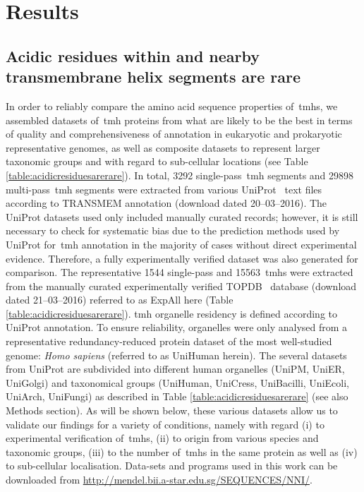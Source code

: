 \section{Results}

\subsection{Acidic residues within and nearby transmembrane helix segments are rare}

In order to reliably compare the amino acid sequence properties of~\gls{tmh}s, we assembled datasets of~\gls{tmh} proteins from what are likely to be the best in terms of quality and comprehensiveness of annotation in eukaryotic and prokaryotic representative genomes, as well as composite datasets to represent larger taxonomic groups and with regard to sub-cellular locations (see Table \ref{table:acidicresiduesarerare}).
In total, 3292 single-pass~\gls{tmh} segments and 29898 multi-pass~\gls{tmh} segments were extracted from various UniProt~\cite{TheUniProtConsortium2014} text files according to TRANSMEM annotation (download dated 20--03--2016).
The UniProt datasets used only included manually curated records; however, it is still necessary to check for systematic bias due to the prediction methods used by UniProt for~\gls{tmh} annotation in the majority of cases without direct experimental evidence.
Therefore, a fully experimentally verified dataset was also generated for comparison.
The representative 1544 single-pass and 15563~\gls{tmh}s were extracted from the manually curated experimentally verified TOPDB~\cite{Dobson2015} database (download dated 21--03--2016) referred to as ExpAll here (Table \ref{table:acidicresiduesarerare}).
\gls{tmh} organelle residency is defined according to UniProt annotation.
To ensure reliability, organelles were only analysed from a representative redundancy-reduced protein dataset of the most well-studied genome: \textit{Homo sapiens} (referred to as UniHuman herein).
The several datasets from UniProt  are subdivided into different human organelles (UniPM, UniER, UniGolgi) and taxonomical groups (UniHuman, UniCress, UniBacilli, UniEcoli, UniArch, UniFungi) as described in Table \ref{table:acidicresiduesarerare} (see also Methods section).
As will be shown below, these various datasets allow us to validate our findings for a variety of conditions, namely with regard (i) to experimental verification of~\gls{tmh}s, (ii) to origin from various species and taxonomic groups, (iii) to the number of~\gls{tmh}s in the same protein as well as (iv) to sub-cellular localisation.
Data-sets and programs used in this work can be downloaded from \url{http://mendel.bii.a-star.edu.sg/SEQUENCES/NNI/}.

